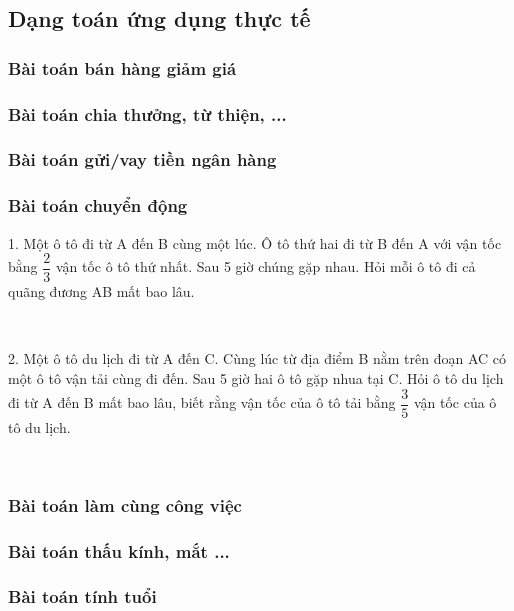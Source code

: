 \documentclass[12pt]{article}
\begin{document}
\subsection{Dạng toán ứng dụng thực tế}

\subsubsection{Bài toán bán hàng giảm giá}

\subsubsection{Bài toán chia thưởng, từ thiện, ...}

\subsubsection{Bài toán gửi/vay tiền ngân hàng}

\subsubsection{Bài toán chuyển động}
1. Một ô tô đi từ A đến B cùng một lúc. Ô tô thứ hai đi từ B đến A với vận tốc bằng $\dfrac{2}{3}$ vận tốc ô tô thứ nhất. Sau 5 giờ chúng gặp nhau. Hỏi mỗi ô tô đi cả quãng đương AB mất bao lâu. \par

\   

2. Một ô tô du lịch đi từ A đến C. Cùng lúc từ địa điểm B nằm trên đoạn AC có một ô tô vận tải cùng đi đến. Sau 5 giờ hai ô tô gặp nhua tại C. Hỏi ô tô du lịch đi từ A đến B mất bao lâu, biết rằng vận tốc của ô tô tải bằng $\dfrac{3}{5}$ vận tốc của ô tô du lịch. \par

\    

\subsubsection{Bài toán làm cùng công việc}

\subsubsection{Bài toán thấu kính, mắt ...}

\subsubsection{Bài toán tính tuổi}
\end{document}
